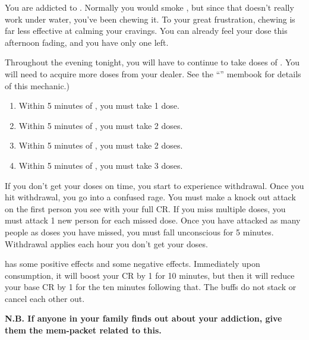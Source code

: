 \documentclass[green]{NeptuneBall}
\begin{document}
\name{\gAddicted{}}

You are addicted to \iDrug{}. Normally you would smoke \iDrug{}, but since that doesn't really work under water, you've been chewing it. To your great frustration, chewing is far less effective at calming your cravings. You can already feel your dose this afternoon fading, and you have only one left.

Throughout the evening tonight, you will have to continue to take doses of \iDrug{}. You will need to acquire more doses from your dealer. See the ``\mSpyBook{}'' membook for details of this mechanic.)

\begin{enumerate}
	\item Within 5 minutes of \cTFifteen{\MYname{}}, you must take 1 dose.
	\item Within 5 minutes of \cTOneFifteen{\MYname{}}, you must take 2 doses.
	\item Within 5 minutes of \cTTwoFifteen{\MYname{}}, you must take 2 doses.
	\item Within 5 minutes of \cTThreeFifteen{\MYname{}}, you must take 3 doses.
\end{enumerate}

If you don't get your doses on time, you start to experience withdrawal. Once you hit withdrawal, you go into a confused rage. You must make a knock out attack on the first person you see with your full CR. If you miss multiple doses, you must attack 1 new person for each missed dose. Once you have attacked as many people as doses you have missed, you must fall unconscious for 5 minutes. Withdrawal applies each hour you don't get your doses.

\iDrug{} has some positive effects and some negative effects. Immediately upon consumption, it will boost your CR by 1 for 10 minutes, but then it will reduce your base CR by 1 for the ten minutes following that. The buffs do not stack or cancel each other out.

{\bf N.B. If anyone in your family finds out about your addiction, give them the mem-packet related to this.}
\end{document}
